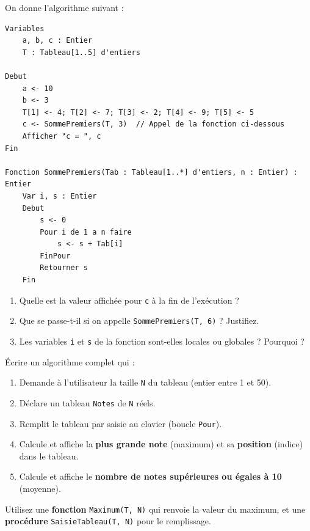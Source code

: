 \documentclass[11pt]{article}
\newcounter{popsec}
\newcounter{popsub}
\newcommand{\courssub}[1]{%
  \stepcounter{popsub}%
  \par\vspace{9pt}\noindent{\popxbold\fontsize{11.5}{13}\selectfont\color{popink}{\color{poporange}\thepopsec.\thepopsub}\hspace{6pt}#1}\par\nopagebreak\vspace{4pt}
}
\begin{document}
\begin{exercice}
On donne l'algorithme suivant :
\begin{lstlisting}
Variables
    a, b, c : Entier
    T : Tableau[1..5] d'entiers

Debut
    a <- 10
    b <- 3
    T[1] <- 4; T[2] <- 7; T[3] <- 2; T[4] <- 9; T[5] <- 5
    c <- SommePremiers(T, 3)  // Appel de la fonction ci-dessous
    Afficher "c = ", c
Fin

Fonction SommePremiers(Tab : Tableau[1..*] d'entiers, n : Entier) : Entier
    Var i, s : Entier
    Debut
        s <- 0
        Pour i de 1 a n faire
            s <- s + Tab[i]
        FinPour
        Retourner s
    Fin
\end{lstlisting}
\begin{enumerate}
    \item Quelle est la valeur affichée pour \texttt{c} à la fin de l'exécution ?
    \item Que se passe-t-il si on appelle \texttt{SommePremiers(T, 6)} ? Justifiez.
    \item Les variables \texttt{i} et \texttt{s} de la fonction sont-elles locales ou globales ? Pourquoi ?
\end{enumerate}
\end{exercice}

\courssub{Je m'entraîne}

\begin{exercice}
Écrire un algorithme complet qui :
\begin{enumerate}
    \item Demande à l'utilisateur la taille \texttt{N} du tableau (entier entre 1 et 50).
    \item Déclare un tableau \texttt{Notes} de \texttt{N} réels.
    \item Remplit le tableau par saisie au clavier (boucle \texttt{Pour}).
    \item Calcule et affiche la \textbf{plus grande note} (maximum) et sa \textbf{position} (indice) dans le tableau.
    \item Calcule et affiche le \textbf{nombre de notes supérieures ou égales à 10} (moyenne).
\end{enumerate}
Utilisez une \textbf{fonction} \texttt{Maximum(T, N)} qui renvoie la valeur du maximum, et une \textbf{procédure} \texttt{SaisieTableau(T, N)} pour le remplissage.
\end{exercice}
\end{document}
